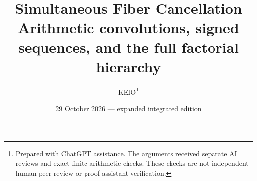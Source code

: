 \usepackage{fancyhdr,listings,xurl}
\usepackage[colorlinks=true,linkcolor=blue!40!black,citecolor=blue!40!black,urlcolor=blue!40!black]{hyperref}
\pagestyle{fancy}\fancyhf{}
\fancyfoot[C]{\thepage}
\setlength{\headheight}{14pt}
\setlength{\emergencystretch}{2em}
\allowdisplaybreaks
\newtheorem{theorem}{Theorem}[section]
\newtheorem{lemma}[theorem]{Lemma}
\newtheorem{proposition}[theorem]{Proposition}
\newtheorem{corollary}[theorem]{Corollary}
\theoremstyle{definition}
\newtheorem{problem}[theorem]{Auxiliary problem}
\newtheorem{definition}[theorem]{Definition}
\theoremstyle{remark}
\newtheorem{remark}[theorem]{Remark}
\newcommand{\Q}{\mathbb Q}
\newcommand{\Z}{\mathbb Z}
\newcommand{\N}{\mathbb N}
\newcommand{\Stir}[2]{\left\{\begin{matrix}#1\\#2\end{matrix}\right\}}
\newcommand{\V}{\mathcal V}
\DeclareMathOperator{\rank}{rank}

\title{Simultaneous Fiber Cancellation\\[3pt]
\large Arithmetic convolutions, signed sequences, and the full factorial hierarchy}
\author{KEIO\thanks{Prepared with ChatGPT assistance. The arguments received separate AI reviews and exact finite arithmetic checks. These checks are not independent human peer review or proof-assistant verification.}}
\date{29 October 2026 --- expanded integrated edition}

\maketitle

